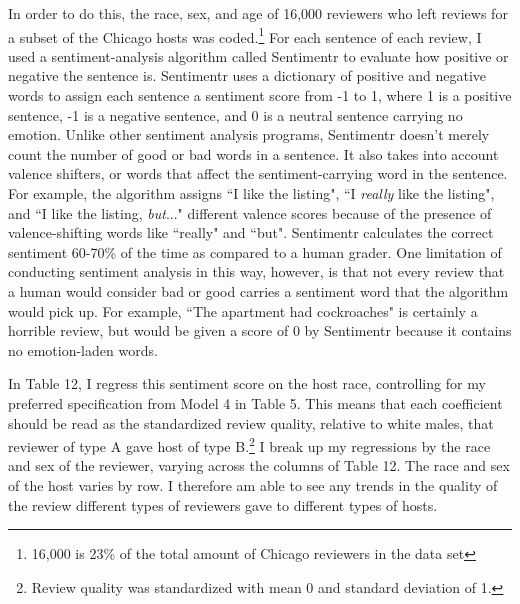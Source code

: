 In order to do this, the race, sex, and age of 16,000 reviewers who left reviews for a subset of the Chicago hosts was coded.\footnote{16,000 is 23\% of the total amount of Chicago reviewers in the data set} For each sentence of each review, I used a sentiment-analysis algorithm called Sentimentr to evaluate how positive or negative the sentence is. Sentimentr uses a dictionary of positive and negative words to assign each sentence a sentiment score from -1 to 1, where 1 is a positive sentence, -1 is a negative sentence, and 0 is a neutral sentence carrying no emotion. Unlike other sentiment analysis programs, Sentimentr doesn't merely count the number of good or bad words in a sentence. It also takes into account valence shifters, or words that affect the sentiment-carrying word in the sentence. For example, the algorithm assigns ``I like the listing", ``I \textit{really} like the listing", and ``I like the listing, \textit{but}..." different valence scores because of the presence of valence-shifting words like ``really" and ``but". Sentimentr calculates the correct sentiment 60-70\% of the time as compared to a human grader. One limitation of conducting sentiment analysis in this way, however, is that not every review that a human would consider bad or good carries a sentiment word that the algorithm would pick up. For example, ``The apartment had cockroaches" is certainly a horrible review, but would be given a score of 0 by Sentimentr because it contains no emotion-laden words. 

In Table 12, I regress this sentiment score on the host race, controlling for my preferred specification from Model 4 in Table 5. This means that each coefficient should be read as the standardized review quality, relative to white males, that reviewer of type A gave host of type B.\footnote{Review quality was standardized with mean 0 and standard deviation of 1.} I break up my regressions by the race and sex of the reviewer, varying across the columns of Table 12. The race and sex of the host varies by row. I therefore am able to see any trends in the quality of the review different types of reviewers gave to different types of hosts. 

